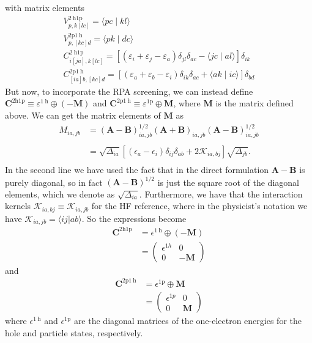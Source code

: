 with matrix elements
$$
\begin{gathered}
V_{p, k[l c]}^{2 \mathrm{~h} 1 \mathrm{p}}=\langle p c \mid k l\rangle \\
V_{p,[k c] d}^{2 \mathrm{p} 1 \mathrm{~h}}=\langle p k \mid d c\rangle \\
C_{i[j a], k[l c]}^{2 \mathrm{~h} 1 \mathrm{p}}=\left[\left(\varepsilon_i+\varepsilon_j-\varepsilon_a\right) \delta_{j l} \delta_{a c}-\langle j c \mid a l\rangle\right] \delta_{i k} \\
C_{[i a] b,[k c] d}^{2 \mathrm{p} 1 \mathrm{~h}}=\left[\left(\varepsilon_a+\varepsilon_b-\varepsilon_i\right) \delta_{i k} \delta_{a c}+\langle a k \mid i c\rangle\right] \delta_{b d}
\end{gathered}
$$
But now, to incorporate the RPA screening, we can instead define $\bm{C}^{2 \text{h1p}} \equiv \varepsilon^{1 \mathrm{~h}} \oplus(-\bm{M})$ and $\bm{C}^{2 \mathrm{p} 1 \mathrm{~h}} \equiv \varepsilon^{1 \mathrm{p}} \oplus \bm{M}$, where $\bm{M}$ is the matrix defined above. We can get the matrix elements of $\bm{M}$ as
\begin{align}
    M_{i a, j b} &= \left(\bm{A}-\bm{B}\right)^{1 / 2}_{i a, j b} \left(\bm{A}+\bm{B}\right)_{i a, j b} \left(\bm{A}-\bm{B}\right)^{1 / 2}_{i a, j b} \\
\\
&= \sqrt{\Delta _{ia}}\left[\left(\epsilon_a-\epsilon_i\right) \delta_{i j} \delta_{a b}+2 \mathcal{K}_{i a, b j}
\right] \sqrt{\Delta _{jb}}. \\
\end{align}
In the second line we have used the fact that in the direct formulation $\bm{A}-\bm{B}$ is purely diagonal, so in fact $\left(\bm{A}-\bm{B}\right)^{1/2}$ is just the square root of the diagonal elements, which we denote as $\sqrt{\Delta_{ia}}$. Furthermore, we have that the interaction kernels $\mathcal{K}_{ia,bj} \equiv \mathcal{K}_{i a, j b}$ for the HF reference, where in the physicist's notation we have $\mathcal{K}_{i a, j b} = \langle i j | a b \rangle$. So the expressions become
\begin{align}
    \bm{C}^{2 \text{h1p}} &= \epsilon^{1 \mathrm{~h}} \oplus (-\bm{M}) \\
& = \begin{pmatrix}
    \epsilon ^{1h} & 0 \\
    0 & -\bm{M}
\end{pmatrix}
\end{align}
and
\begin{align}
    \bm{C}^{2 \mathrm{p} 1 \mathrm{~h}} &= \epsilon^{1 \mathrm{p}} \oplus \bm{M} \\
& = \begin{pmatrix}
    \epsilon ^{1p} & 0 \\
    0 & \bm{M}
\end{pmatrix}
\end{align}
where $\epsilon^{1 \mathrm{~h}}$ and $\epsilon^{1 \mathrm{p}}$ are the diagonal matrices of the one-electron energies for the hole and particle states, respectively. 

